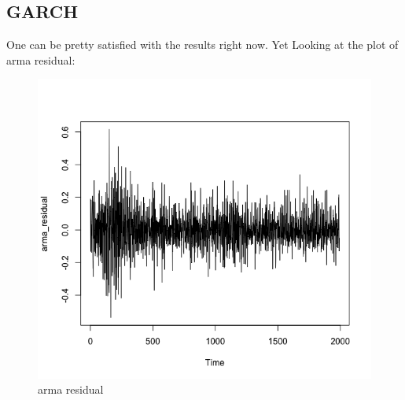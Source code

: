 \documentclass[a4paper, 11pt]{article}
\begin{document}
\subsection{GARCH}
One can be pretty satisfied with the results right now. Yet Looking at the plot of arma residual:
\begin{figure}[H]
\centering
\caption{arma residual}
\includegraphics[scale=.60]{armares.png}
\end{figure}
\end{document}
